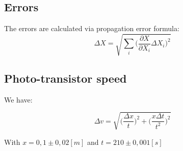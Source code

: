 \documentclass[11pt]{article} %
\begin{document}
\label{last page}



\pagebreak
\newpage

\cfoot{\thepage/\pageref{LastPage}}

\begin{appendices}
	\section{Errors}
	The errors are calculated via propagation error formula:
	\begin{equation*}
		 \Delta X=\sqrt{\sum_{i}\Bigg(\frac{\partial X}{\partial X_i}\Delta X_i\Bigg)^2} 
	\end{equation*}

	\subsection{Photo-transistor speed}

	We have:

	\begin{equation*}
		\Delta v=\sqrt{\Bigg(\frac{\Delta x}{t}\Bigg)^2+\Bigg(\frac{x\Delta t}{t^2}\Bigg)^2} 
   \end{equation*}

   With $x=0,1\pm0,02[m]$ and $t=210\pm0,001[s]$
\end{appendices}
\end{document}

